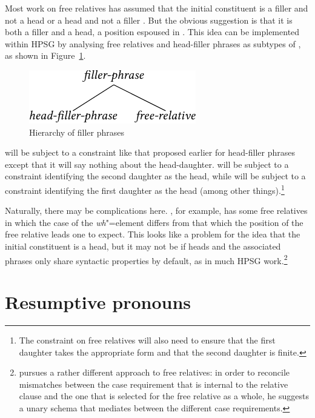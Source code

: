 \documentclass[output=paper
,notxmath 
	        ,collection
	        ,collectionchapter
 	        ,biblatex
                ,babelshorthands
                ,newtxmath
                ,draftmode
                ,colorlinks, citecolor=brown
]{langscibook}
\begin{document}
Most work on free relatives has assumed that the initial constituent is a filler and not a head
\citep{Groos:Riemsdijk:81,Grosu:2003} or a head and not a filler
\citep{Bresnan:Grimshaw:78}. But the obvious suggestion is that it is
both a filler and a head, a position espoused in
\citet[Chapter~12.6]{Huddleston02}. This idea can be implemented within HPSG by
analysing free relatives and head-filler phrases as subtypes of
, as shown in Figure~\ref{fig:UDC:67}.


\begin{figure}
  \centering

  \includegraphics{figures/BB-filler-phrase-crop}
  \caption{\label{fig:UDC:67}Hierarchy of filler phrases}
  
\end{figure}

\noindent
{} will be subject to a constraint like that proposed earlier
for head-filler phrases except that it will say nothing about the
head-daughter.  will be subject to a constraint
identifying the second daughter as the head, while  will
be subject to a constraint identifying the first daughter as the head
(among other things).\footnote{The constraint on free relatives will also
  need to ensure that the first daughter takes the appropriate form and
  that the second daughter is finite.}

Naturally, there may be complications here. , for example, has
some free relatives in which the case of the \emph{wh}"=element differs from
that which the position of the free relative leads one to expect. This
looks like a problem for the idea that the initial constituent is a
head, but it may not be if heads and the associated phrases only share
syntactic properties by default, as in much HPSG
work.\footnote{\citet{Mueller:99a} pursues a rather different approach
  to free relatives: in order to reconcile 
mismatches between the case requirement that is internal to the relative
clause and the one that is selected for the free relative as a whole,
he suggests a unary schema that mediates between the
different case requirements.}%

\section{Resumptive pronouns}
\label{sec:UDC:ResumptivePronouns}
\end{document}

